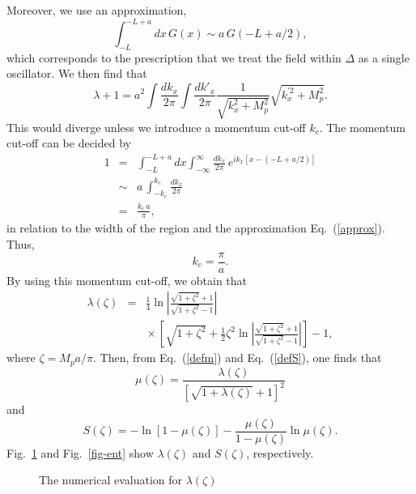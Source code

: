 \documentclass[12pt,epsf]{article}
\begin{document}
Moreover, we use an approximation,
\begin{equation}
  \int^{-L+a}_{-L} dx\, G(x) \sim a\,G(-L+a/2),
\label{approx}
\end{equation}
which corresponds to the prescription that we treat the field
within $\Delta$ as a single oscillator.
We then find that
\begin{equation}
 \lambda+1= a^2 \int \frac{dk_x}{2\pi}\int \frac{dk'_x}{2\pi}
   \frac{1}{\sqrt{k_x^2+M_p^2}}\sqrt{k_x^{'2}+M_p^2}.
\end{equation}
This would diverge unless we introduce a momentum cut-off $k_c$.
The momentum cut-off can be decided by
\begin{eqnarray}
 1&=&\int^{-L+a}_{-L}dx \int^\infty_{-\infty} \frac{dk_x}{2\pi}
   \,e^{ik_x[x-(-L+a/2)]} \nonumber \\
  &\sim & a\,\int^{k_c}_{-k_c} \frac{dk_x}{2\pi} \nonumber \\
  &=& \frac{k_c\,a}{\pi},
\label{cutoff}
\end{eqnarray}
in relation to the width of the region
and the approximation Eq.~(\ref{approx}).
Thus, 
\begin{equation}
k_c=\frac{\pi}{a}.
\end{equation}
By using this momentum cut-off, we obtain that
\begin{eqnarray}
  \lambda(\zeta) &=&\frac{1}{4}
  \ln\left|\frac{\sqrt{1+\zeta^2}+1}{\sqrt{1+\zeta^2}-1}\right|
  \nonumber \\
   & & {}\times
  \left[\sqrt{1+\zeta^2}+\frac{1}{2}\zeta^2
 \ln\left|\frac{\sqrt{1+\zeta^2}+1}{\sqrt{1+\zeta^2}-1}\right|
 \right]-1,
\end{eqnarray}
where $\zeta=M_pa/\pi$.
Then, from Eq.~(\ref{defm}) and Eq.~(\ref{defS}),
one finds that
\begin{equation}
  \mu(\zeta) = \frac{\lambda(\zeta)}
      {\left[\sqrt{1+\lambda(\zeta)}+1\right]^2}
\end{equation}
and
\begin{equation}
  S(\zeta)=-\ln[1-\mu(\zeta)]
    -\frac{\mu(\zeta)}{1-\mu(\zeta)}\ln\mu(\zeta).
\end{equation}
Fig.~\ref{fig-lam} and Fig.~\ref{fig-ent}
show $\lambda(\zeta)$ and $S(\zeta)$,
respectively.

\begin{figure}
\begin{center}
\leavevmode
\epsfysize=7cm
\caption{The numerical evaluation for $\lambda(\zeta)$}
\label{fig-lam}
\end{center}
\end{figure}
\end{document}
